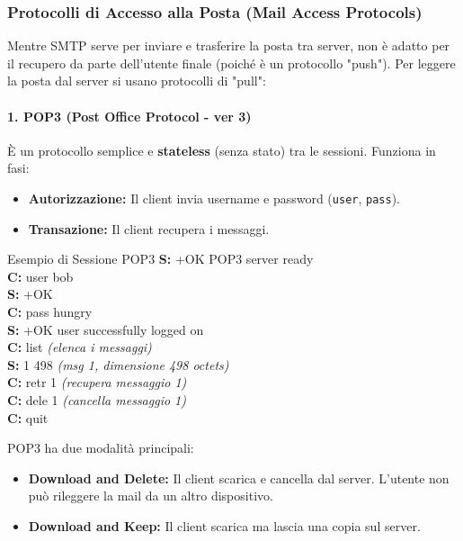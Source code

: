 \documentclass[a4paper,12pt]{report}
\begin{document}
\newpage
\subsubsection{Protocolli di Accesso alla Posta (Mail Access Protocols)}
Mentre SMTP serve per inviare e trasferire la posta tra server, non è adatto per il recupero da parte dell'utente finale (poiché è un protocollo "push"). Per leggere la posta dal server si usano protocolli di "pull":

\paragraph{1. POP3 (Post Office Protocol - ver 3)}
È un protocollo semplice e \textbf{stateless} (senza stato) tra le sessioni. Funziona in fasi:
\begin{itemize}
    \item \textbf{Autorizzazione:} Il client invia username e password (\texttt{user}, \texttt{pass}).
    \item \textbf{Transazione:} Il client recupera i messaggi.
\end{itemize}

\begin{esempiobox}{Esempio di Sessione POP3}
\textbf{S:} +OK POP3 server ready \\
\textbf{C:} user bob \\
\textbf{S:} +OK \\
\textbf{C:} pass hungry \\
\textbf{S:} +OK user successfully logged on \\
\textbf{C:} list \textit{(elenca i messaggi)} \\
\textbf{S:} 1 498 \textit{(msg 1, dimensione 498 octets)} \\
\textbf{C:} retr 1 \textit{(recupera messaggio 1)} \\
\textbf{C:} dele 1 \textit{(cancella messaggio 1)} \\
\textbf{C:} quit
\end{esempiobox}

POP3 ha due modalità principali:
\begin{itemize}
    \item \textbf{Download and Delete:} Il client scarica e cancella dal server. L'utente non può rileggere la mail da un altro dispositivo.
    \item \textbf{Download and Keep:} Il client scarica ma lascia una copia sul server.
\end{itemize}
\end{document}
